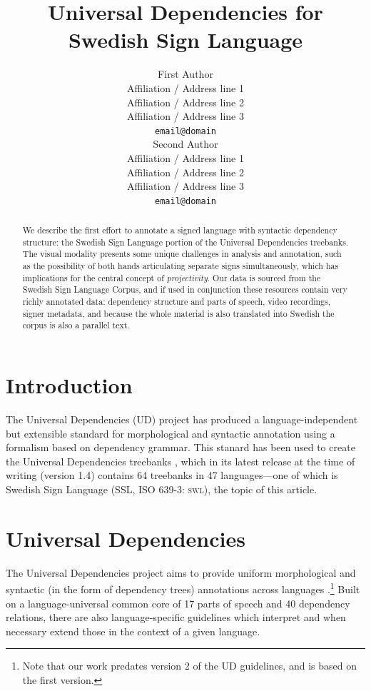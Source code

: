 \documentclass[11pt]{article}
\title{Universal Dependencies for Swedish Sign Language}
\author{First Author \\
  Affiliation / Address line 1 \\
  Affiliation / Address line 2 \\
  Affiliation / Address line 3 \\
  {\tt email@domain} \\\And
  Second Author \\
  Affiliation / Address line 1 \\
  Affiliation / Address line 2 \\
  Affiliation / Address line 3 \\
  {\tt email@domain} \\}
\date{}
\begin{document}
\maketitle
\begin{abstract}
    We describe the first effort to annotate a signed language with syntactic
    dependency structure: the Swedish Sign Language portion of the
    Universal Dependencies treebanks.
    The visual modality presents some unique challenges in analysis and
    annotation, such as the possibility of
    both hands articulating separate signs simultaneously, which has
    implications for the central concept of \emph{projectivity}.
    Our data is sourced from the Swedish Sign Language Corpus,
    and if used in conjunction these resources contain very richly
    annotated data: dependency structure and parts of speech,
    video recordings, signer metadata, and because the whole material is
    also translated into Swedish the corpus is also a parallel text.
\end{abstract}

\section{Introduction}

The Universal Dependencies (UD) project \cite{Nivre2016ud} 
has produced a language-independent but extensible standard for
morphological and syntactic annotation using a formalism based on
dependency grammar. This stanard has been used to create the Universal
Dependencies treebanks \cite{ud14}, which in its latest release at the time of
writing (version 1.4) contains 64 treebanks in 47 languages---one of which is
Swedish Sign Language (SSL, ISO 639-3: \textsc{swl}), the topic of this
article.


\section{Universal Dependencies}

The Universal Dependencies project aims to provide uniform morphological and
syntactic (in the form of dependency trees) annotations across languages
\cite{Nivre2016ud}.\footnote{Note that our work predates version 2 of the UD
guidelines, and is based on the first version.}
Built on a language-universal common core of 17 parts of speech and
40 dependency relations, there are also language-specific guidelines which
interpret and when necessary extend those in the context of a given language.
\end{document}
